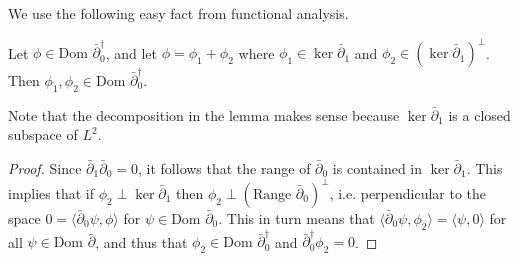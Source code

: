 \documentclass{../mathnotes}
\begin{document}
We use the following easy fact from functional analysis.
\begin{lem}
    Let $\phi\in\text{Dom }\bar\partial_0^\dagger$, and let $\phi=\phi_1+\phi_2$ where $\phi_1\in\ker\bar\partial_1$
    and $\phi_2\in(\ker\bar\partial_1)^\perp$. Then $\phi_1,\phi_2\in\text{Dom }\bar\partial_0^\dagger$.
\end{lem}
Note that the decomposition in the lemma makes sense because $\ker\bar\partial_1$ is a closed subspace of $L^2$.
\begin{proof}
    Since $\bar\partial_1\bar\partial_0=0$, it follows that the range of $\bar\partial_0$ is contained in $\ker\bar\partial_1$.
    This implies that if $\phi_2\perp\ker\bar\partial_1$ then $\phi_2\perp(\text{Range }\bar\partial_0)^\perp$, i.e. perpendicular
    to the space $0=\langle\bar\partial_0\psi,\phi\rangle$ for $\psi\in\text{Dom }\bar\partial_0$. This in turn means that
    $\langle\bar\partial_0\psi,\phi_2\rangle=\langle\psi,0\rangle$ for all $\psi\in\text{Dom }\bar\partial$, and thus that
    $\phi_2\in\text{Dom }\bar\partial_0^\dagger$ and $\bar\partial_0^\dagger\phi_2=0$.
\end{proof}
\end{document}
